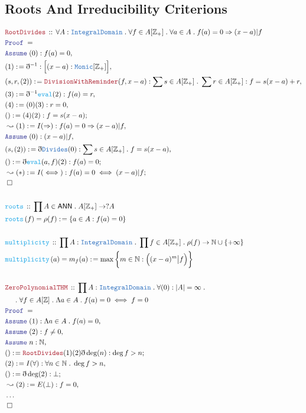 \documentclass[12pt]{scrartcl}
\newcommand{\TYPE}[1]{\textcolor{NavyBlue}{\mathtt{#1}}}
\newcommand{\FUNC}[1]{\textcolor{Cerulean}{\mathtt{#1}}}
\newcommand{\LOGIC}[1]{\textcolor{Blue}{\mathtt{#1}}}
\newcommand{\THM}[1]{\textcolor{Maroon}{\mathtt{#1}}}
\renewcommand{\.}{\; . \;}
\newcommand{\de}{: \kern 0.1pc =}
\newcommand{\Act}[1]{\left( #1 \right)}
\newcommand{\Theorem}[2]{& \THM{#1} \, :: \, #2 \\ & \Proof = \\ }
\newcommand{\DeclareFunc}[2]{& \FUNC{#1} \, :: \, #2 \\}
\newcommand{\DefineNamedFunc}[4]{&  \FUNC{#1}\Act{#2} = #3 \de #4 \\}
\newcommand{\NewLine}{\\ & \kern 1pc}
\newcommand{\Page}[1]{ \begin{align*} #1 \end{align*}   }
\newcommand{ \bd }{ \ByDef }
\newcommand{\NoProof}{ & \ldots \\ \EndProof}
\newcommand{\Int}{\mathbb{Z} }
\newcommand{\Nat}{\mathbb{N} }
\newcommand{\Say}[3]{& #1 \de #2 : #3, \\}
\newcommand{\Conclude}[3]{& #1 \de #2 : #3; \\}
\newcommand{\Derive}[3]{& \leadsto #1 \de #2 : #3, \\}
\newcommand{\DeriveConclude}[3]{& \leadsto #1 \de #2 : #3 ; \\}
\newcommand{\Assume}[2]{& \LOGIC{Assume} \; #1 : #2, \\}
\newcommand{\QED}{\; \square}
\newcommand{\EndProof}{& \QED \\}
\newcommand{\ByDef}{\eth}
\newcommand{\Proof}{\LOGIC{Proof} \; }
\newcommand{\ID}{\TYPE{IntegralDomain}}
\newcommand{\ANN}{\mathsf{ANN}}
\begin{document}
\subsection{Roots And Irreducibility Criterions}
\Page{
	\Theorem{RootDivides}{ \forall A : \ID \.  \forall f \in  A[\Int_+]  \. \forall a \in A \. f(a) = 0 \Rightarrow  (x - a) | f  }
	\Assume{(0)}{  f(a) = 0  }
	\Say{(1)}{\bd^{-1}  }{\Big[ (x - a) : \TYPE{Monic}[\Int_+] \Big]}
	\Say{(s,r,(2))}{\THM{DivisionWithReminder}(f,x-a)}{ \sum s \in A[\Int_+] \. \sum r \in A[\Int_+] :  f = s(x - a) + r }
	\Say{(3)}{\bd^{-1}\FUNC{eval}(2)}{f(a) = r}
	\Say{(4)}{ (0)(3)   }{  r = 0   }
	\Conclude{()}{  (4)(2) }{  f = s(x - a)  }
	\Derive{(1)}{  I(\Rightarrow) }{  f(a) = 0 \Rightarrow (x-a)|f   }
	\Assume{(0)}{(x - a) | f}
	\Say{(s,(2))}{  \bd \TYPE{Divides}(0)   }{  \sum s \in A[\Int_+] \.  f = s(x - a) }
	\Conclude{()}{ \bd \FUNC{eval}(a,f)(2)   }{  f(a) = 0  }
	\DeriveConclude{(*)}{I(\iff)}{ f(a) = 0 \iff (x - a)|f }
	\EndProof
	\\
	\DeclareFunc{roots}{\prod A \in \ANN \. A[\Int_+] \to ?A }
	\DefineNamedFunc{roots}{f}{\rho(f)}{\{a \in A : f(a) = 0 \}}
	\\
	\DeclareFunc{multiplicity}{\prod A : \ID \.  \prod f \in A[\Int_+] \. \rho(f) \to \Nat \cup \{+\infty\} }
	\DefineNamedFunc{multiplicity}{a}{m_f(a)}{\max \bigg\{  m \in \Nat :\Big( (x - a)^m \big| f \Big)  \bigg\}}	
	\\
	\Theorem{ZeroPolynomialTHM}{ \prod A : \ID \. \forall (0) : |A| = \infty \. \NewLine \. \forall f \in A[\Int] \.  \Lambda a \in A \. f(a)  = 0 \iff f = 0   }   
	\Assume{(1)}{\Lambda a \in A \. f(a) = 0}
	\Assume{(2)}{f \neq 0}
	\Assume{n}{\Nat}
	\Conclude{()}{\THM{RootDivides}(1)(2)\bd \deg (n)}{  \deg f > n  }
	\Say{(2)}{I(\forall)}{\forall n \in \Nat \. \deg f > n}
	\Conclude{()}{\bd \deg (2)}{\bot}
	\Derive{(2)}{E(\bot)}{f = 0}
	\NoProof
}
\end{document}

